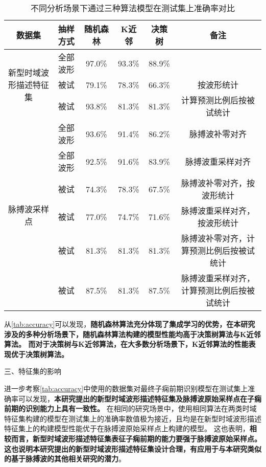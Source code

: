 \begin{table}[htbp]
      \centering
      \caption{\label{tab:accuracy}不同分析场景下通过三种算法模型在测试集上准确率对比}
      \begin{tabular}{cccccc}
      \toprule
      \textbf{数据集}&\textbf{抽样方式}&\textbf{随机森林}&\textbf{K近邻}&\textbf{决策树}&\textbf{备注}\\
      \midrule
      \multirow{3}{*}{新型时域波形描述特征集} & 全部波形 & 97.0\% & 93.3\% &  88.9\%& \\
            & 被试 & 79.1\% & 78.3\% & 66.3\% & 按波形统计\\
            & 被试 & 93.8\% & 81.3\% & 81.3\% & 计算预测比例后按被试统计\\
      \multirow{6}{*}{脉搏波采样点} & 全部波形 & 93.6\% & 91.4\% & 86.2\% & 脉搏波补零对齐\\
                  & 全部波形 & 92.5\% & 91.6\% & 83.9\% & 脉搏波重采样对齐\\
                  & 被试 & 74.3\% & 78.3\% & 67.5\% & 脉搏波补零对齐，按波形统计\\
                  & 被试& 77.0\% & 74.7\% & 71.6\% & 脉搏波重采样对齐，按波形统计\\
                  & 被试 & 81.3\% & 81.3\% & 81.3\% & 脉搏波补零对齐，计算预测比例后按被试统计\\
                  & 被试& 87.5\% & 81.3\% & 87.5\% & 脉搏波重采样对齐，计算预测比例后按被试统计\\      
      \bottomrule
      \end{tabular}%
\end{table}%

从\autoref{tab:accuracy}可以发现，\textbf{随机森林算法充分体现了集成学习的优势，在本研究涉及的多种分析场景下，随机森林算法构建的模型性能均高于决策树算法与K近邻算法。
而对于决策树与K近邻算法，在大多数分析场景下，K近邻算法的性能表现优于决策树算法。}

三、特征集的影响

进一步考察\autoref{tab:accuracy}中使用的数据集对最终子痫前期识别模型在测试集上准确率可以发现，\textbf{本研究提出的新型时域波形描述特征集及脉搏波原始采样点在子痫前期的识别能力上具有一致性。}
在相同的研究场景中，使用相同算法在两类时域特征集构建的模型在测试集上的准确率数值极为接近，且均是在新型时域波形描述特征集上的构建模型性能优于在脉搏波原始采样点上构建的模型。
这也表明，\textbf{相较而言，新型时域波形描述特征集表征子痫前期的能力要强于脉搏波原始采样点。这也说明本研究提出的新型时域波形描述特征集设计合理，有应用于与本研究类似的基于脉搏波的其他相关研究的潜力}。

